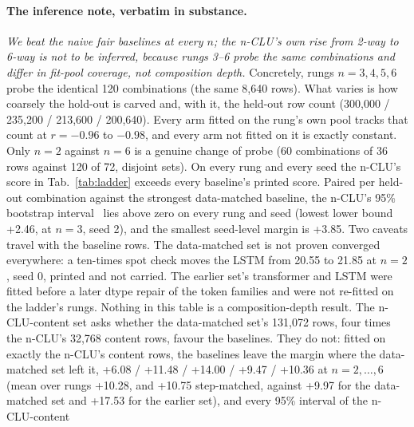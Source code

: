 \documentclass{article} %
\begin{document}
\paragraph{The inference note, verbatim in substance.} \emph{We beat the naive fair baselines at
every $n$; the n-CLU's own rise from 2-way to 6-way is not to be inferred, because rungs 3--6
probe the same combinations and differ in fit-pool coverage, not composition depth.} Concretely,
rungs $n=3,4,5,6$ probe the identical 120 combinations (the same 8,640 rows). What varies is how
coarsely the hold-out is carved and, with it, the held-out row count (300,000 / 235,200 /
213,600 / 200,640). Every arm fitted on the rung's own pool tracks that count at
$r=-0.96$ to $-0.98$, and every arm not fitted on it is exactly constant.
Only $n=2$ against $n=6$ is a genuine change of probe (60 combinations of 36 rows against 120 of
72, disjoint sets). %
On every rung and every seed the n-CLU's score in Tab.~\ref{tab:ladder} exceeds every baseline's
printed score. Paired per held-out combination against the strongest data-matched baseline, the n-CLU's 95\% %
bootstrap interval~\citep{efron_bootstrap_1979} lies above zero on every rung and seed (lowest lower
bound +2.46, at $n=3$, seed 2), and the smallest seed-level margin is +3.85. Two caveats travel with %
the baseline rows. The data-matched set is not proven converged everywhere: a ten-times spot check %
moves the LSTM from 20.55 to 21.85 at $n=2$, seed 0, printed and not carried. The earlier set's %
transformer and LSTM were fitted before a later dtype repair of the
token families and were not re-fitted on the ladder's rungs. Nothing in this table is a
composition-depth result.
The n-CLU-content set asks whether the data-matched set's 131,072 rows, four times the n-CLU's
32,768 content rows, favour the baselines. They do not: fitted on exactly the n-CLU's content rows, %
the baselines leave the margin where the data-matched set left it, +6.08 / +11.48 / +14.00 / +9.47 / %
+10.36 at $n=2,\ldots,6$ (mean over rungs +10.28, and +10.75 step-matched, against +9.97 for the %
data-matched set and +17.53 for the earlier set), and every 95\% interval of the n-CLU-content %
\end{document}

